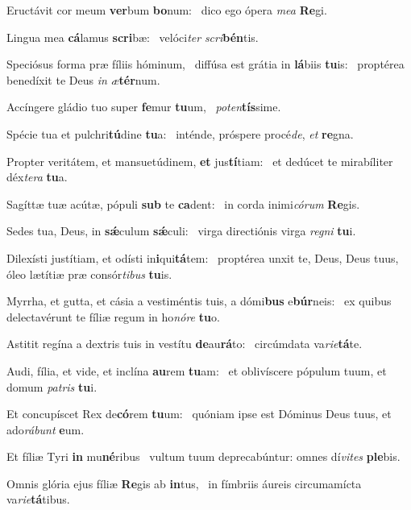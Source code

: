 \item Eructávit cor meum \textbf{ver}bum \textbf{bo}num:~\psstar{} dico ego ópera \textit{me}\textit{a} \textbf{Re}gi.
\item Lingua mea \textbf{cá}lamus \textbf{scri}bæ:~\psstar{} velóci\textit{ter} \textit{scri}\textbf{bén}tis.
\item Speciósus forma præ fíliis hóminum,~\pscross{} diffúsa est grátia in \textbf{lá}biis \textbf{tu}is:~\psstar{} proptérea benedíxit te Deus \textit{in} \textit{æ}\textbf{tér}num.
\item Accíngere gládio tuo super \textbf{fe}mur \textbf{tu}um,~\psstar{} \textit{pot}\textit{en}\textbf{tís}sime.
\item Spécie tua et pulchri\textbf{tú}dine \textbf{tu}a:~\psstar{} inténde, próspere procé\textit{de}, \textit{et} \textbf{re}gna.
\item Propter veritátem, et mansuetúdinem, \textbf{et} jus\textbf{tí}tiam:~\psstar{} et dedúcet te mirabíliter déx\textit{te}\textit{ra} \textbf{tu}a.
\item Sagíttæ tuæ acútæ, pópuli \textbf{sub} te \textbf{ca}dent:~\psstar{} in corda inimi\textit{có}\textit{rum} \textbf{Re}gis.
\item Sedes tua, Deus, in \textbf{sǽ}culum \textbf{sǽ}culi:~\psstar{} virga directiónis virga \textit{re}\textit{gni} \textbf{tu}i.
\item Dilexísti justítiam, et odísti in\textbf{i}qui\textbf{tá}tem:~\psstar{} proptérea unxit te, Deus, Deus tuus, óleo lætítiæ præ consór\textit{ti}\textit{bus} \textbf{tu}is.
\item Myrrha, et gutta, et cásia a vestiméntis tuis, a dómi\textbf{bus} e\textbf{búr}neis:~\psstar{} ex quibus delectavérunt te fíliæ regum in ho\textit{nó}\textit{re} \textbf{tu}o.
\item Astitit regína a dextris tuis in vestítu \textbf{de}au\textbf{rá}to:~\psstar{} circúmdata va\textit{ri}\textit{e}\textbf{tá}te.
\item Audi, fília, et vide, et inclína \textbf{au}rem \textbf{tu}am:~\psstar{} et oblivíscere pópulum tuum, et domum \textit{pa}\textit{tris} \textbf{tu}i.
\item Et concupíscet Rex de\textbf{có}rem \textbf{tu}um:~\psstar{} quóniam ipse est Dóminus Deus tuus, et ado\textit{rá}\textit{bunt} \textbf{e}um.
\item Et fíliæ Tyri \textbf{in} mu\textbf{né}ribus~\psstar{} vultum tuum deprecabúntur: omnes dí\textit{vi}\textit{tes} \textbf{ple}bis.
\item Omnis glória ejus fíliæ \textbf{Re}gis ab \textbf{in}tus,~\psstar{} in fímbriis áureis circumamícta va\textit{ri}\textit{e}\textbf{tá}tibus.
